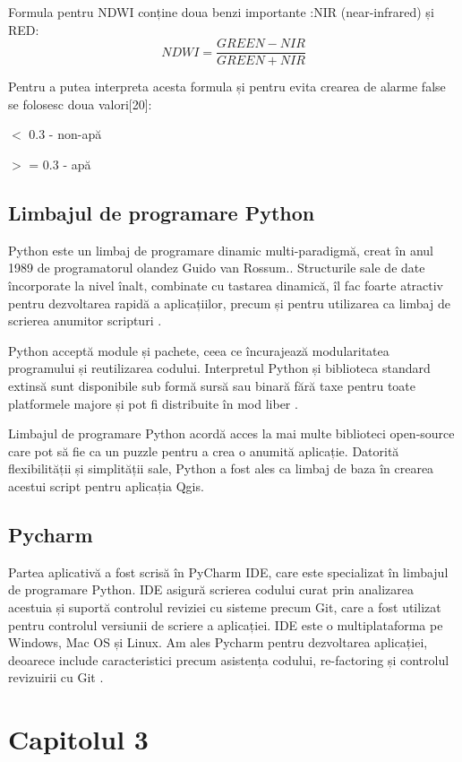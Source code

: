 \documentclass[12pt,a4paper]{article}
\theoremstyle{definition}
\theoremstyle{remark}
\begin{document}
 Formula pentru NDWI conține doua benzi importante :NIR (near-infrared) și  RED\cite{ndwi}:
    $$ NDWI = \frac{GREEN-NIR}{GREEN+NIR} $$
    
    Pentru a putea interpreta acesta formula și pentru evita crearea de alarme false se folosesc doua valori[20]:
   
       $<$ 0.3 - non-apă
       
    $>$ = 0.3 - apă
    
 \subsection{Limbajul de programare Python}
 
 Python este un limbaj de programare dinamic multi-paradigmă, creat în anul 1989 de programatorul olandez Guido van Rossum.. Structurile sale de date încorporate la nivel înalt, combinate cu tastarea dinamică, îl fac foarte atractiv pentru dezvoltarea rapidă a aplicațiilor, precum și pentru utilizarea ca limbaj de scrierea anumitor scripturi \cite{python}.
 
Python acceptă module și pachete, ceea ce încurajează modularitatea programului și reutilizarea codului. Interpretul Python și biblioteca standard extinsă sunt disponibile sub formă sursă sau binară fără taxe pentru toate platformele majore și pot fi distribuite în mod liber \cite{python}.

Limbajul de programare Python acordă  acces la mai multe biblioteci open-source care pot să fie ca un puzzle pentru a crea o anumită aplicație. Datorită flexibilității și simplității sale, Python a fost ales ca limbaj de baza în crearea acestui script pentru aplicația Qgis. 

\subsection{Pycharm}

Partea aplicativă a fost scrisă în PyCharm IDE, care este specializat în limbajul de programare Python. IDE asigură scrierea codului curat prin analizarea acestuia și suportă controlul reviziei cu sisteme precum Git, care a fost utilizat pentru controlul versiunii de scriere a aplicației. IDE este o  multiplataforma pe Windows, Mac OS și Linux.\cite{py} Am ales Pycharm  pentru dezvoltarea aplicației, deoarece include caracteristici precum asistența codului, re-factoring și controlul revizuirii cu Git \cite{py}.

\newpage
\section*{\bf Capitolul 3}
\markright{}
\end{document}
